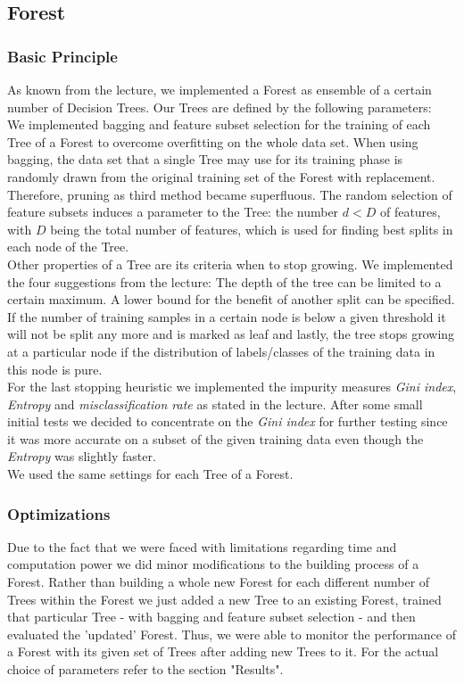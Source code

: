 \documentclass[twocolumn]{article}
\begin{document}
\subsection{Forest}

\subsubsection{Basic Principle}
As known from the lecture, we implemented a Forest as ensemble of a certain number of Decision Trees. Our Trees are defined by the following parameters:\\
We implemented bagging and feature subset selection for the training of each Tree of a Forest to overcome overfitting on the whole data set. When using bagging, the data set that a single Tree may use for its training phase is randomly drawn from the original training set of the Forest with replacement. Therefore, pruning as third method became superfluous. The random selection of feature subsets induces a parameter to the Tree: the number $d<D$ of features, with $D$ being the total number of features, which is used for finding best splits in each node of the Tree.\\
Other properties of a Tree are its criteria when to stop growing. We implemented the four suggestions from the lecture: The depth of the tree can be limited to a certain maximum. A lower bound for the benefit of another split can be specified. If the number of training samples in a certain node is below a given threshold it will not be split any more and is marked as leaf and lastly, the tree stops growing at a particular node if the distribution of labels/classes of the training data in this node is pure.\\
For the last stopping heuristic we implemented the impurity measures \textit{Gini index}, \textit{Entropy} and \textit{misclassification rate} as stated in the lecture. After some small initial tests we decided to concentrate on the \textit{Gini index} for further testing since it was more accurate on a subset of the given training data even though the \textit{Entropy} was slightly faster.\\
We used the same settings for each Tree of a Forest.

\subsubsection{Optimizations}
Due to the fact that we were faced with limitations regarding time and computation power we did minor modifications to the building process of a Forest. Rather than building a whole new Forest for each different number of Trees within the Forest we just added a new Tree to an existing Forest, trained that particular Tree - with bagging and feature subset selection - and then evaluated the 'updated' Forest. Thus, we were able to monitor the performance of a Forest with its given set of Trees after adding new Trees to it. For the actual choice of parameters refer to the section "Results".
\end{document}
